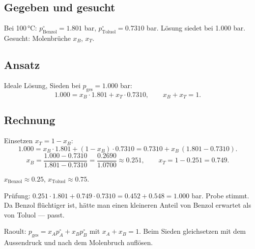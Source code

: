 
\subsection*{Gegeben und gesucht}
Bei 100\,°C: $p^\circ_{\text{Benzol}}=1.801$ bar,
$p^\circ_{\text{Toluol}}=0.7310$ bar. Lösung siedet bei 1.000 bar.
Gesucht: Molenbrüche $x_B$, $x_T$.

\subsection*{Ansatz}
Ideale Lösung, Sieden bei $p_{\text{ges}}=1.000$ bar:
\[
  1.000 = x_B\cdot1.801 + x_T\cdot0.7310,\qquad x_B + x_T = 1 .
\]

\subsection*{Rechnung}
Einsetzen $x_T = 1-x_B$:
\[
  1.000 = x_B\cdot1.801 + (1-x_B)\cdot0.7310
  = 0.7310 + x_B\,(1.801-0.7310) .
\]
\[
  x_B = \frac{1.000-0.7310}{1.801-0.7310}
      = \frac{0.2690}{1.0700} \approx 0.251,
  \qquad x_T = 1-0.251 = 0.749.
\]

\begin{ergebnis}
$x_{\text{Benzol}} \approx 0.25$, $x_{\text{Toluol}} \approx 0.75$.
\end{ergebnis}

\begin{kontrolle}
Prüfung: $0.251\cdot1.801+0.749\cdot0.7310
=0.452+0.548=1.000$ bar. Probe stimmt. Da Benzol flüchtiger ist, hätte man
einen kleineren Anteil von Benzol erwartet als von Toluol --- passt.
\end{kontrolle}

\begin{merksatz}
Raoult: $p_{\text{ges}}=x_Ap_A^\circ+x_Bp_B^\circ$ mit $x_A+x_B=1$. Beim
Sieden gleichsetzen mit dem Aussendruck und nach dem Molenbruch auflösen.
\end{merksatz}
